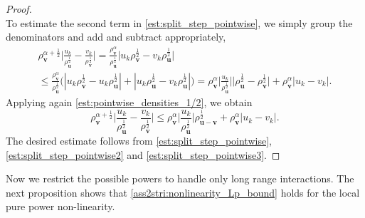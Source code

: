\documentclass[12pt,a4paper]{amsart}
\numberwithin{equation}{section}
\newcommand{\ulu}{\boldsymbol{u}}
\newcommand{\ulv}{\boldsymbol{v}}
\begin{document}
\begin{proof}
\begin{equation}
		\end{equation}
		To estimate the second term in \eqref{est:split_step_pointwise}, we simply group the denominators and add and subtract appropriately,
		\begin{multline*}
			\rho_{\ulv}^{\alpha+\frac{1}{2}}  \Bigg|  \frac{u_k}{\rho_{\ulu}^{\frac{1}{2}}} - \frac{v_k}{\rho_{\ulv}^{\frac{1}{2}}} \Bigg| = \frac{\rho_{\ulv}^{\alpha} }{\rho_{\ulu}^{\frac{1}{2}}} \big| u_k \rho_{\ulv}^{\frac{1}{2}} - v_k \rho_{\ulu}^{\frac{1}{2}} \big| \\
			\leq   \frac{\rho_{\ulv}^{\alpha} }{\rho_{\ulu}^{\frac{1}{2}}} \big( | u_k \rho_{\ulv}^{\frac{1}{2}} - u_k \rho_{\ulu}^{\frac{1}{2}} | + | u_k \rho_{\ulu}^{\frac{1}{2}} - v_k \rho_{\ulu}^{\frac{1}{2}} | \big) 
			=  \rho_{\ulv}^{\alpha}  \Bigg| \frac{ u_k}{ \rho_{\ulu}^{\frac{1}{2}}  } \Bigg| \big|  \rho_{\ulu}^{\frac{1}{2}}  - \rho_{\ulv}^{\frac{1}{2}}  \big| +  \rho_{\ulv}^{\alpha}  | u_k-v_k | .
		\end{multline*}
		Applying again \eqref{est:pointwise_densities_1/2}, we obtain%
		\begin{equation}\label{est:split_step_pointwise3}
			\rho_{\ulv}^{\alpha+\frac{1}{2}}  \Bigg| \frac{u_k}{\rho_{\ulu}^{\frac{1}{2}}} - \frac{v_k}{\rho_{\ulv}^{\frac{1}{2}}} \Bigg| \leq \rho_{\ulv}^{\alpha}  \Bigg| \frac{u_k}{ \rho_{\ulu}^{\frac{1}{2}}  } \Bigg| \rho_{\ulu-\ulv}^{\frac{1}{2}}   +  \rho_{\ulv}^{\alpha}  | u_k-v_k | .
		\end{equation}
		The desired estimate follows from \eqref{est:split_step_pointwise}, \eqref{est:split_step_pointwise2} and \eqref{est:split_step_pointwise3}.
	\end{proof}
	
	Now we restrict the possible powers to handle only long range interactions. The next proposition shows that \ref{ass2stri:nonlinearity_Lp_bound} holds for the local pure power non-linearity. 
	
\end{document}
